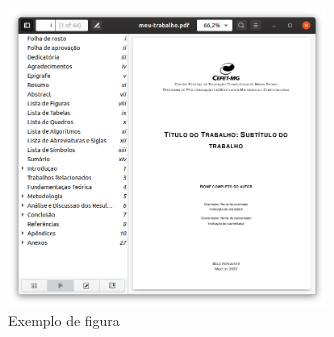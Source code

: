 \begin{apendicesenv}
    \begin{figure}[!htb]
        \centering
        \caption{Exemplo de figura}
        \label{fig_figura_exemplo}
        \includegraphics[width=0.75\textwidth]{figuras/figura-exemplo.png}
    \end{figure}


\end{apendicesenv}
